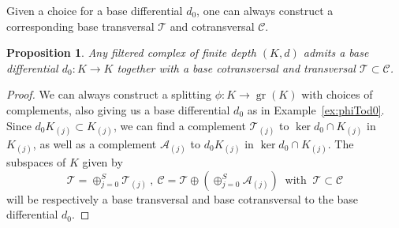 \documentclass[10pt]{amsart}
\newcounter{dummy} \numberwithin{dummy}{section}
\newtheorem{proposition}[dummy]{Proposition}
\theoremstyle{remark}
\newcommand{\calA}{\mathcal{A}}
\newcommand{\calT}{\mathcal{T}}
\newcommand{\calC}{\mathcal{C}}
\DeclareMathOperator{\gr}{gr}
\numberwithin{equation}{section}
\begin{document}
Given a choice for a base differential $d_0$, one can always construct a corresponding base transversal $\mathcal{T}$ and cotransversal $\mathcal{C}$.

\begin{proposition} \label{prop:existence}
Any filtered complex of finite depth $(K,d)$ admits a base differential $d_0\colon K \to K$ together with a base cotransversal and transversal $\calT \subset \calC$.
\end{proposition}

\begin{proof}
We can always construct a splitting $\phi: K \to \gr(K)$ with choices of complements, also giving us a base differential $d_0$ as in Example~\ref{ex:phiTod0}. Since $d_0 K_{(j)}  \subset K_{(j)}$, we can find a complement $\calT_{(j)}$ to $\ker d_0\cap K_{(j)}$ in $K_{(j)}$, as well as a complement $\calA_{(j)}$ to $d_0K_{(j)}$ in $\ker d_0\cap K_{(j)}$. The subspaces of $K$ given by
\begin{equation} \label{calTsplitt}\calT = \oplus_{j=0}^S \calT_{(j)}\ , \ \calC = \calT \oplus (\oplus_{j=0}^S \calA_{(j)})\ \text{ with }\ \mathcal{T}\subset\mathcal{C} \end{equation}
will be respectively a base transversal and base cotransversal to the base differential $d_0$.
\end{proof}
\end{document}
